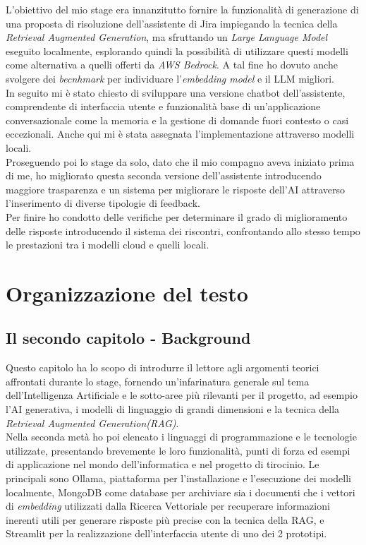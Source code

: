 L'obiettivo del mio stage era innanzitutto fornire la funzionalità di 
generazione di una proposta di risoluzione dell'assistente di Jira impiegando 
la tecnica della \textit{Retrieval Augmented Generation}, ma sfruttando un 
\textit{Large Language Model} eseguito localmente, esplorando quindi la possibilità di utilizzare questi modelli come alternativa a quelli offerti da \textit{AWS Bedrock}. 
A tal fine ho dovuto anche svolgere dei \textit{becnhmark} per individuare l'\textit{embedding model} e il LLM migliori.\\
In seguito mi è stato chiesto di sviluppare una versione chatbot 
dell'assistente, comprendente di interfaccia utente e funzionalità base di 
un'applicazione conversazionale come la memoria e la gestione di domande fuori contesto o casi eccezionali. 
Anche qui mi è stata assegnata l'implementazione attraverso modelli locali.\\
Proseguendo poi lo stage da solo, dato che il mio compagno aveva iniziato 
prima di me, ho migliorato questa seconda versione dell'assistente 
introducendo maggiore trasparenza e un sistema per migliorare le risposte 
dell'AI attraverso l'inserimento di diverse tipologie di feedback.\\
Per finire ho condotto delle verifiche per determinare il grado di miglioramento delle risposte introducendo il sistema dei riscontri, 
confrontando allo stesso tempo le prestazioni tra i modelli cloud e quelli locali.

\newpage
\section{Organizzazione del testo}

\subsection{Il secondo capitolo - Background}
Questo capitolo ha lo scopo di introdurre il lettore agli argomenti teorici 
affrontati durante lo stage, fornendo un'infarinatura generale sul tema 
dell'Intelligenza Artificiale e le sotto-aree più rilevanti per il progetto, 
ad esempio l'AI generativa, i modelli di linguaggio di grandi dimensioni e la 
tecnica della \textit{Retrieval Augmented Generation(RAG)}.\\
Nella seconda metà ho poi elencato i linguaggi di programmazione e le 
tecnologie utilizzate, presentando brevemente le loro funzionalità, punti di
forza ed esempi di applicazione nel mondo dell'informatica e nel progetto di 
tirocinio. 
Le principali sono Ollama, piattaforma per l'installazione e l'esecuzione dei 
modelli localmente, MongoDB come database per archiviare sia i documenti che i 
vettori di \textit{embedding} utilizzati dalla Ricerca Vettoriale per 
recuperare informazioni inerenti utili per generare risposte più precise con
la tecnica della RAG, e Streamlit per la realizzazione dell'interfaccia utente 
di uno dei 2 prototipi.

